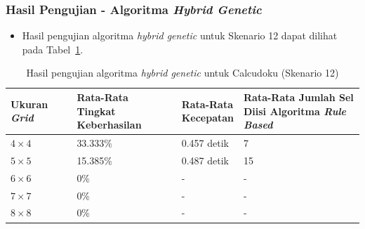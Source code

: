\documentclass{beamer}
\begin{document}
\begin{frame}
\frametitle{Hasil Pengujian - Algoritma \textit{Hybrid Genetic}}
\begin{itemize}
\item Hasil pengujian algoritma \textit{hybrid genetic} untuk Skenario 12 dapat dilihat pada Tabel~\ref{tab:pengujianhg12}.
\end{itemize}
\begin{table}
\tiny
\centering
\captionsetup{justification=centering}
\caption[Hasil pengujian algoritma \textit{hybrid genetic} untuk Calcudoku (Skenario 12)]{Hasil pengujian algoritma \textit{hybrid genetic} untuk Calcudoku (Skenario 12)}
\begin{tabular}{| l | l | l | l |}
\hline
Ukuran \textit{Grid} & \makecell[c]{Rata-Rata \\ Tingkat Keberhasilan} & \makecell[c]{Rata-Rata \\ Kecepatan} & \makecell[c]{Rata-Rata Jumlah Sel \\ Diisi Algoritma \textit{Rule Based}} \\
\hline \hline
\begin{math}4 \times 4\end{math} & 33.333\% & 0.457 detik & 7 \\
\hline
\begin{math}5 \times 5\end{math} & 15.385\% & 0.487 detik & 15 \\
\hline
\begin{math}6 \times 6\end{math} & 0\% & - & - \\
\hline
\begin{math}7 \times 7\end{math} & 0\% & - & - \\
\hline
\begin{math}8 \times 8\end{math} & 0\% & - & - \\
\hline
\end{tabular}
\label{tab:pengujianhg12}
\end{table}
\end{frame}

\end{document}
